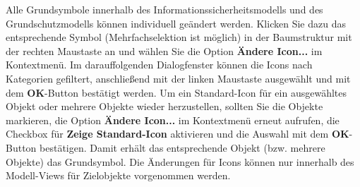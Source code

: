 \documentclass[a4paper,10pt]{book}
\begin{document}
Alle Grundsymbole innerhalb des Informationssicherheitsmodells und des Grundschutzmodells können individuell geändert werden.
Klicken Sie dazu das entsprechende Symbol (Mehrfachselektion ist möglich) in der Baumstruktur mit der rechten Maustaste an und wählen Sie die Option
\textbf{Ändere Icon...} im Kontextmenü. Im darauffolgenden Dialogfenster können die Icons nach Kategorien gefiltert,
anschließend mit der linken Maustaste ausgewählt und mit dem \textbf{OK}-Button bestätigt werden.
Um ein Standard-Icon für ein ausgewähltes Objekt oder mehrere Objekte wieder herzustellen, sollten Sie die Objekte markieren,
die Option \textbf{Ändere Icon...} im Kontextmenü erneut aufrufen, die Checkbox für \textbf{Zeige Standard-Icon} aktivieren und
die Auswahl mit dem \textbf{OK}-Button bestätigen. Damit erhält das entsprechende Objekt (bzw. mehrere Objekte) das Grundsymbol.
Die Änderungen für Icons können nur innerhalb des Modell-Views für Zielobjekte vorgenommen werden.
\end{document}
